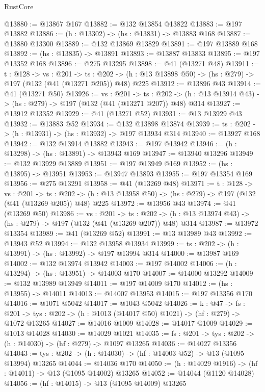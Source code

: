 \begin{lexlean}{RustCore}
\begin{coremodule}
@13880 := @13867 @167
@13882 := @132 @13854 @13822
@13883 := @197 @13882
@13886 := (h : @13302) -> (hs : @13831) -> @13883 @168
@13887 := @13880 @13300
@13889 := @132 @13869 @13829
@13891 := @197 @13889 @168
@13892 := (hs : @13835) -> @13891
@13893 := @13887 @13833
@13895 := @197 @13352 @168
@13896 := @275 @13295
@13898 := @41 (@13271 @48)
@13911 := {t : @128} ->
  {vs : @201} ->
  {ts : @202} -> (h : @13 @13898 @50) -> (hs : @279) -> @197 (@132 (@41 (@13271 @205)) @48) @225
@13912 := @13896 @43
@13914 := @41 (@13271 @50)
@13926 := {vs : @201} ->
  {ts : @202} -> (h : @13 @13914 @43) -> (hs : @279) -> @197 (@132 (@41 (@13271 @207)) @48) @314
@13927 := @13912 @13352
@13929 := @41 (@13271 @52)
@13931 := @13 @13929 @43
@13932 := @13883 @52
@13934 := @132 @13898 @13874
@13939 := {ts : @202} -> (h : @13931) -> (hs : @13932) -> @197 @13934 @314
@13940 := @13927 @168
@13942 := @132 @13914 @13882
@13943 := @197 @13942
@13946 := (h : @13298) -> (hs : @13891) -> @13943 @169
@13947 := @13940 @13296
@13949 := @132 @13929 @13889
@13951 := @197 @13949 @169
@13952 := (hs : @13895) -> @13951
@13953 := @13947 @13893
@13955 := @197 @13354 @169
@13956 := @275 @13291
@13958 := @41 (@13269 @48)
@13971 := {t : @128} ->
  {vs : @201} ->
  {ts : @202} -> (h : @13 @13958 @50) -> (hs : @279) -> @197 (@132 (@41 (@13269 @205)) @48) @225
@13972 := @13956 @43
@13974 := @41 (@13269 @50)
@13986 := {vs : @201} ->
  {ts : @202} -> (h : @13 @13974 @43) -> (hs : @279) -> @197 (@132 (@41 (@13269 @207)) @48) @314
@13987 := @13972 @13354
@13989 := @41 (@13269 @52)
@13991 := @13 @13989 @43
@13992 := @13943 @52
@13994 := @132 @13958 @13934
@13999 := {ts : @202} -> (h : @13991) -> (hs : @13992) -> @197 @13994 @314
@14000 := @13987 @169
@14002 := @132 @13974 @13942
@14003 := @197 @14002
@14006 := (h : @13294) -> (hs : @13951) -> @14003 @170
@14007 := @14000 @13292
@14009 := @132 @13989 @13949
@14011 := @197 @14009 @170
@14012 := (hs : @13955) -> @14011
@14013 := @14007 @13953
@14015 := @197 @13356 @170
@14016 := @1071 @5042
@14017 := @1043 @5042
@14026 := {k : @47} ->
  {fs : @201} -> {tys : @202} -> (h : @1013 (@14017 @50) @1021) -> (hf : @279) -> @1072 @13265
@14027 := @14016 @1009
@14028 := @14017 @1009
@14029 := @1013 @14028
@14030 := @14029 @1021
@14035 := {fs : @201} -> {tys : @202} -> (h : @14030) -> (hf : @279) -> @1097 @13265
@14036 := @14027 @13356
@14043 := {tys : @202} -> (h : @14030) -> (hf : @14003 @52) -> @13 (@1095 @13994) @13265
@14044 := @14036 @170
@14050 := (h : @14029 @1916) -> (hf : @14011) -> @13 (@1095 @14002) @13265
@14052 := @14044 (@1120 @14028)
@14056 := (hf : @14015) -> @13 (@1095 @14009) @13265

\end{coremodule}
\end{lexlean}
